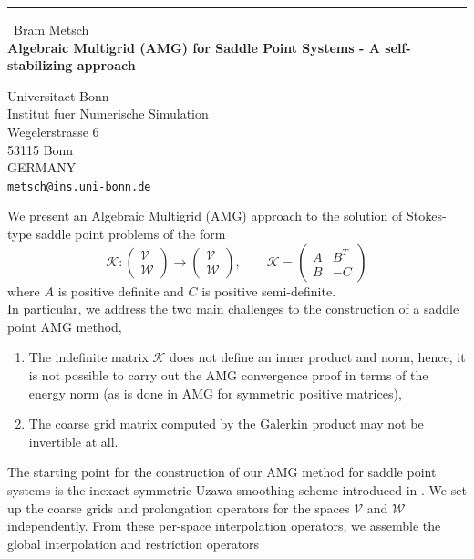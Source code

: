 \documentclass{report}
\begin{document}
\begin{center}
\rule{6in}{1pt} \
{\large Bram Metsch \\
{\bf Algebraic Multigrid (AMG) for Saddle Point Systems - A self-stabilizing approach}}

Universitaet Bonn \\ Institut fuer Numerische Simulation \\ Wegelerstrasse 6 \\ 53115 Bonn \\ GERMANY
\\
{\tt metsch@ins.uni-bonn.de}\end{center}

We present an Algebraic Multigrid (AMG) approach to the solution of
Stokes-type saddle point problems of the form
\begin{equation*}
\mathcal{K}: \begin{pmatrix} \mathcal{V} \\ \mathcal{W} \end{pmatrix}
\rightarrow\begin{pmatrix} \mathcal{V} \\ \mathcal{W} \end{pmatrix},
\qquad \mathcal{K} = \begin{pmatrix} A & B^T \\ B & -C \end{pmatrix}
\end{equation*}
where $A$ is positive definite and $C$ is positive semi-definite.\\
In particular, we address the two main challenges to the
construction of a saddle point AMG method,
\begin{enumerate}
\item The indefinite matrix $\mathcal{K}$ does not define an inner product
and norm, hence, it is not possible to carry out the AMG convergence
proof in terms of the energy norm (as is done in AMG for symmetric
positive matrices),
\item The coarse grid matrix computed by the Galerkin product may not
be invertible at all.
\end{enumerate}
The starting point for the construction of our AMG method for saddle
point systems is the inexact symmetric Uzawa smoothing scheme
introduced in \cite{Schoeberl.Zulehner:2003}. We set up the
coarse grids and prolongation operators for the spaces $\mathcal{V}$
and $\mathcal{W}$ independently. From these per-space interpolation operators,
we assemble the global interpolation and restriction operators
\end{document}
